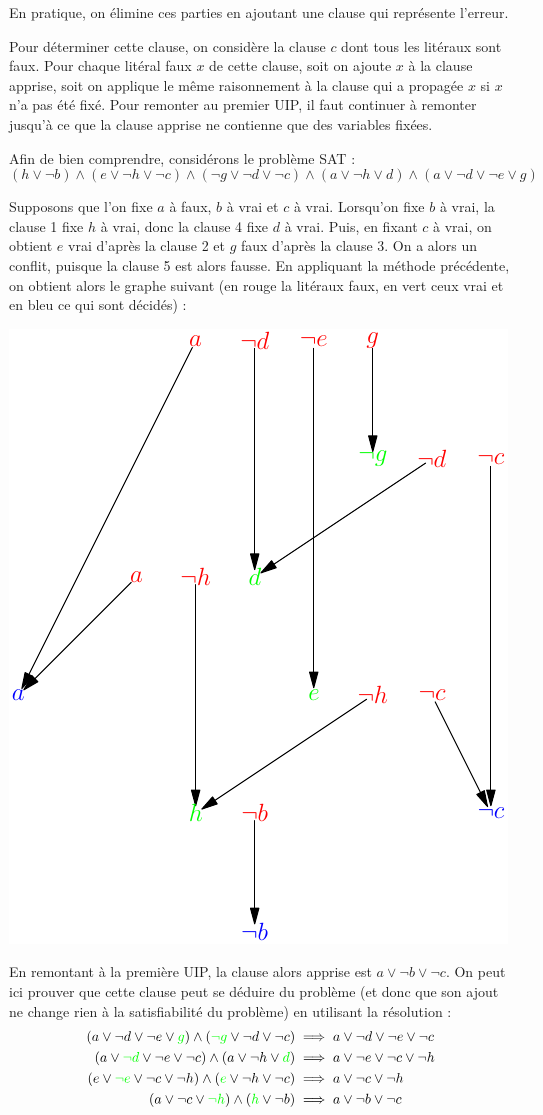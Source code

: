 En pratique, on élimine ces parties en ajoutant une clause qui représente
l'erreur.

Pour déterminer cette clause, on considère la clause $c$ dont tous les litéraux
sont faux. Pour chaque litéral faux $x$ de cette clause, soit on ajoute $x$ à
la clause apprise, soit on applique le même raisonnement à la clause qui a
propagée $x$ si $x$ n'a pas été fixé. Pour remonter au premier UIP, il faut
continuer à remonter jusqu'à ce que la clause apprise ne contienne que des
variables fixées.

Afin de bien comprendre, considérons le problème SAT :
\[ (h\vee\neg b) \wedge (e\vee\neg h\vee\neg c)
   \wedge (\neg g\vee\neg d\vee\neg c) \wedge (a\vee\neg h\vee d)
   \wedge (a\vee\neg d\vee\neg e\vee g)\]

Supposons que l'on fixe $a$ à faux, $b$ à vrai et $c$ à vrai. Lorsqu'on fixe
$b$ à vrai, la clause 1 fixe $h$ à vrai, donc la clause 4 fixe $d$ à vrai.
Puis, en fixant $c$ à vrai, on obtient $e$ vrai d'après la clause 2 et $g$
faux d'après la clause 3. On a alors un conflit, puisque la clause 5 est alors
fausse. En appliquant la méthode précédente, on obtient alors le graphe
suivant (en rouge la litéraux faux, en vert ceux vrai et en bleu ce qui sont
décidés) :
\begin{center}
\includegraphics[width=0.5\linewidth]{reso/graph.pdf}
\end{center}

En remontant à la première UIP, la clause alors apprise est
$a\vee\neg b\vee\neg c$. On peut ici prouver que cette clause peut se déduire
du problème (et donc que son ajout ne change rien à la satisfiabilité du
problème) en utilisant la résolution :
\begin{align*}
    (a\vee\neg d\vee\neg e\vee {\color{green}g})
    \wedge({\color{green}\neg g}\vee\neg d\vee\neg c)
        &\implies a\vee\neg d\vee\neg e\vee\neg c \\
    (a\vee{\color{green}\neg d}\vee\neg e\vee\neg c)
    \wedge(a\vee\neg h\vee{\color{green} d})
        &\implies a\vee\neg e\vee\neg c\vee\neg h \\
    (e\vee{\color{green}\neg e}\vee\neg c\vee\neg h)
    \wedge({\color{green}e}\vee\neg h\vee\neg c)
        &\implies a\vee\neg c\vee\neg h \\
    (a\vee\neg c\vee{\color{green}\neg h})\wedge({\color{green} h}\vee\neg b)
        &\implies a\vee\neg b\vee\neg c\\
\end{align*}

